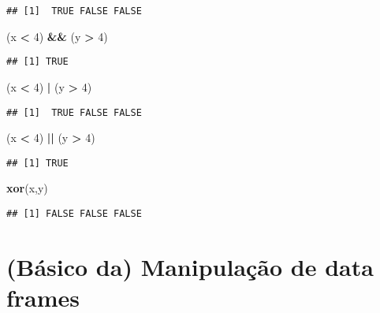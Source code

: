 \documentclass[
]{book}
\newenvironment{Shaded}{\begin{snugshade}}{\end{snugshade}}
\newcommand{\DecValTok}[1]{\textcolor[rgb]{0.00,0.00,0.81}{#1}}
\newcommand{\KeywordTok}[1]{\textcolor[rgb]{0.13,0.29,0.53}{\textbf{#1}}}
\newcommand{\NormalTok}[1]{#1}
\newcommand{\OperatorTok}[1]{\textcolor[rgb]{0.81,0.36,0.00}{\textbf{#1}}}
\newcommand{\StringTok}[1]{\textcolor[rgb]{0.31,0.60,0.02}{#1}}
\begin{document}
\begin{verbatim}
## [1]  TRUE FALSE FALSE
\end{verbatim}

\begin{Shaded}
\begin{Highlighting}[]
\NormalTok{(x }\OperatorTok{<}\StringTok{ }\DecValTok{4}\NormalTok{) }\OperatorTok{&&}\StringTok{ }\NormalTok{(y }\OperatorTok{>}\StringTok{ }\DecValTok{4}\NormalTok{)}
\end{Highlighting}
\end{Shaded}

\begin{verbatim}
## [1] TRUE
\end{verbatim}

\begin{Shaded}
\begin{Highlighting}[]
\NormalTok{(x }\OperatorTok{<}\StringTok{ }\DecValTok{4}\NormalTok{) }\OperatorTok{|}\StringTok{ }\NormalTok{(y }\OperatorTok{>}\StringTok{ }\DecValTok{4}\NormalTok{)}
\end{Highlighting}
\end{Shaded}

\begin{verbatim}
## [1]  TRUE FALSE FALSE
\end{verbatim}

\begin{Shaded}
\begin{Highlighting}[]
\NormalTok{(x }\OperatorTok{<}\StringTok{ }\DecValTok{4}\NormalTok{) }\OperatorTok{||}\StringTok{ }\NormalTok{(y }\OperatorTok{>}\StringTok{ }\DecValTok{4}\NormalTok{)}
\end{Highlighting}
\end{Shaded}

\begin{verbatim}
## [1] TRUE
\end{verbatim}

\begin{Shaded}
\begin{Highlighting}[]
\KeywordTok{xor}\NormalTok{(x,y)}
\end{Highlighting}
\end{Shaded}

\begin{verbatim}
## [1] FALSE FALSE FALSE
\end{verbatim}

\hypertarget{manipulacao}{%
\chapter{(Básico da) Manipulação de data frames}\label{manipulacao}}
\end{document}
